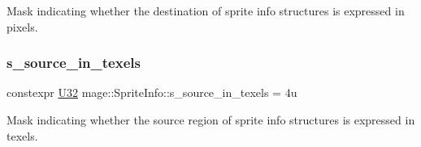 Mask indicating whether the destination of sprite info structures is expressed in pixels. \hypertarget{structmage_1_1_sprite_info_a2a67b4908c2851013e754124bc304fa9}{}\label{structmage_1_1_sprite_info_a2a67b4908c2851013e754124bc304fa9} 
\subsubsection{\texorpdfstring{s\+\_\+source\+\_\+in\+\_\+texels}{s\_source\_in\_texels}}
{\footnotesize\ttfamily constexpr \hyperlink{namespacemage_a41c104c036fba3756a74e19f793eeaa1}{U32} mage\+::\+Sprite\+Info\+::s\+\_\+source\+\_\+in\+\_\+texels = 4u\hspace{0.3cm}{\ttfamily [static]}}

Mask indicating whether the source region of sprite info structures is expressed in texels. 